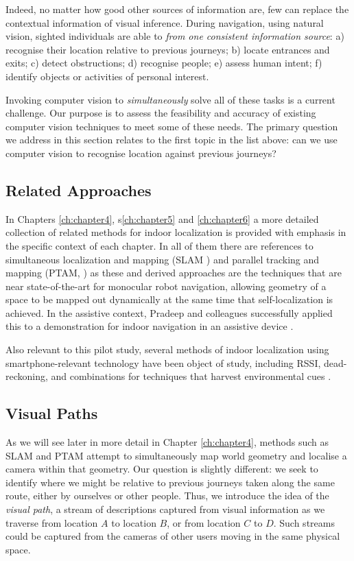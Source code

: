Indeed, no matter how good other sources of information are, few can replace the contextual information of visual inference.  During navigation, using natural vision, sighted individuals are able to {\em from one consistent information source}: a) recognise their location relative to previous journeys; b) locate entrances and exits; c) detect obstructions; d) recognise people; e) assess human intent;
f) identify objects or activities of personal interest.

Invoking computer vision to {\it simultaneously} solve all of these tasks is a current challenge.  Our purpose is to assess the feasibility and accuracy of existing computer vision techniques to meet some of these needs.  The primary question we address in this section relates to the first topic in the list above: can we use computer vision to recognise location against previous journeys?

\subsection{Related Approaches}
 
In Chapters \ref{ch:chapter4}, s\ref{ch:chapter5} and \ref{ch:chapter6} a more detailed collection of related methods for indoor localization is provided with emphasis in the specific context of each chapter. In all of them there are references to simultaneous localization and mapping (SLAM \cite{Durrant-Whyte2006}) and parallel tracking and mapping (PTAM, \cite{Klein2009}) as these and derived approaches are the techniques that  are near state-of-the-art for monocular robot navigation, allowing geometry of a space to be mapped out dynamically at the same time that self-localization is achieved.  In the assistive context, Pradeep and colleagues successfully applied this to a demonstration for indoor navigation in an assistive device \cite{Pradeep2010}.

Also relevant to this pilot study, several methods of indoor localization using smartphone-relevant technology have been object of study, including RSSI, dead-reckoning, and combinations for techniques that harvest environmental cues \cite{Wang2012,Shen}. 
 

\subsection{Visual Paths} 

 As we will see later in more detail in Chapter \ref{ch:chapter4}, methods such as SLAM and PTAM attempt to simultaneously map world geometry and localise a camera within that geometry.  Our question is slightly different: we seek to identify where we might be relative to previous journeys taken along the same route, either by ourselves or other people.  Thus, we introduce the idea of the {\it visual path}, a stream of descriptions captured from visual information as we traverse from location $A$ to location $B$, or from location $C$ to $D$. Such streams could be captured from the cameras of other users moving in the same physical space.

